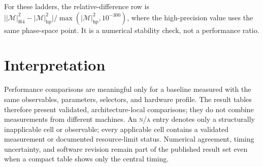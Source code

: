 \documentclass[10pt,letterpaper]{article}
\newcommand{\ReportNA}{\textcolor{ReportMuted}{\textsc{n/a}}}
\begin{document}
For these ladders, the relative-difference row is
\(\bigl||\mathcal M|^2_{\mathrm{f64}}-|\mathcal M|^2_{\mathrm{hp}}\bigr|
/\max(|\mathcal M|^2_{\mathrm{hp}},10^{-300})\), where the high-precision value
uses the same phase-space point. It is a numerical stability check, not a
performance ratio.




\section{Interpretation}

Performance comparisons are meaningful only for a baseline measured with the
same observables, parameters, selectors, and hardware profile. The result
tables therefore present validated, architecture-local comparisons; they do
not combine measurements from different machines. An \ReportNA{} entry denotes
only a structurally inapplicable cell or observable; every applicable cell
contains a validated measurement or documented resource-limit status.
Numerical agreement, timing uncertainty, and software revision remain part of
the published result set even when a compact table shows only the central
timing.

\clearpage

\clearpage

\clearpage

\clearpage


\end{document}
